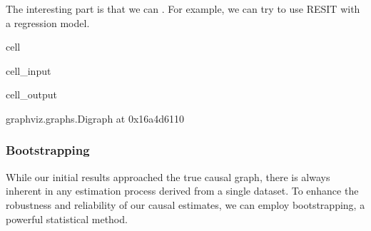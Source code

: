 \documentclass[letterpaper,10pt,english]{jupyterBook}
\begin{document}
\sphinxAtStartPar
The interesting part is that we can . For example, we can try to use RESIT with a  regression model.

\begin{sphinxuseclass}{cell}\begin{sphinxVerbatimInput}

\begin{sphinxuseclass}{cell_input}
\begin{sphinxVerbatim}[commandchars=\\\{\}]
 
   

    
  
 
\end{sphinxVerbatim}

\end{sphinxuseclass}\end{sphinxVerbatimInput}
\begin{sphinxVerbatimOutput}

\begin{sphinxuseclass}{cell_output}
\begin{sphinxVerbatim}[commandchars=\\\{\}]
\PYGZlt{}graphviz.graphs.Digraph at 0x16a4d6110\PYGZgt{}
\end{sphinxVerbatim}

\end{sphinxuseclass}\end{sphinxVerbatimOutput}

\end{sphinxuseclass}

\subsubsection{Bootstrapping}
\label{\detokenize{notebooks/semiparametric_resit:bootstrapping}}
\sphinxAtStartPar
While our initial results approached the true causal graph, there is always inherent  in any estimation process derived from a single dataset. To enhance the robustness and reliability of our causal estimates, we can employ bootstrapping, a powerful statistical  method.
\end{document}
